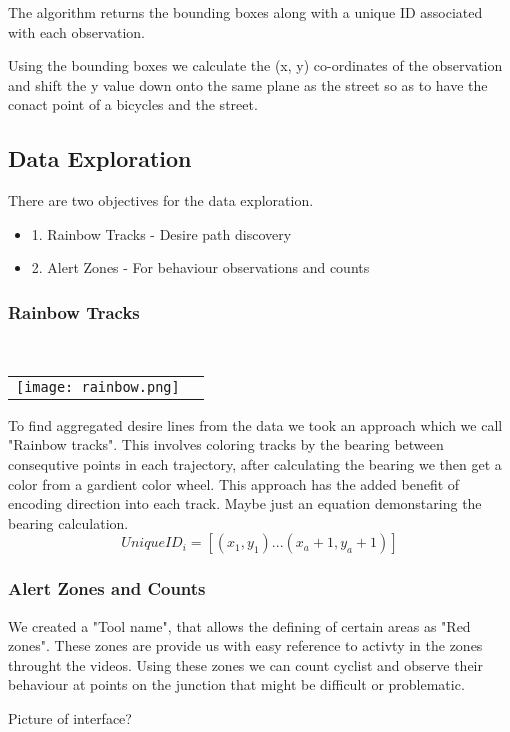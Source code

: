 The algorithm returns the bounding boxes along with a unique ID associated with each observation.

Using the bounding boxes we calculate the (x, y) co-ordinates of the observation and shift the y value down onto 
the same plane as the street so as to have the conact point of a bicycles and the street.

\subsection{Data Exploration}

There are two objectives for the data exploration.
\begin{itemize}
	\item1. Rainbow Tracks - Desire path discovery
	\item2. Alert Zones - For behaviour observations and counts
\end{itemize}

\subsubsection{Rainbow Tracks}

\ \\ 
\noindent
\begin{tabular}{@{}cc}
\texttt{[image: rainbow.png]} 
\end{tabular}
\label{Rainbow}

To find aggregated desire lines from the data we took an approach which we call "Rainbow tracks". This involves coloring tracks by the bearing between consequtive points in each 
trajectory, after calculating the bearing we then get a color from a gardient color wheel. This approach has the added benefit of encoding direction into 
each track.
Maybe just an equation demonstaring the bearing calculation.
\ \\ 
\begin{equation}
  UniqueID_i = [(x_1, y_1)...(x_a+1, y_a+1)]\label{eq:3}
\end{equation}

\subsubsection{Alert Zones and Counts}

We created a "Tool name", that allows the defining of certain areas as "Red zones". These zones are provide us with easy reference to activty in the zones throught the videos.
Using these zones we can count cyclist and observe their behaviour at points on the junction that might be difficult or
problematic.

Picture of interface?
